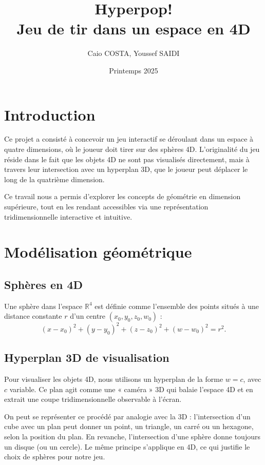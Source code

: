 \documentclass[11pt,a4paper]{article}
\title{Hyperpop! \\ \normalsize{Jeu de tir dans un espace en 4D}}
\author{Caio COSTA, Youssef SAIDI}
\date{Printemps 2025}
\begin{document}
\maketitle

\tableofcontents

\section{Introduction}

Ce projet a consisté à concevoir un jeu interactif se déroulant dans un espace à quatre dimensions, où le joueur doit tirer sur des sphères 4D. L’originalité du jeu réside dans le fait que les objets 4D ne sont pas visualisés directement, mais à travers leur intersection avec un hyperplan 3D, que le joueur peut déplacer le long de la quatrième dimension.

Ce travail nous a permis d'explorer les concepts de géométrie en dimension supérieure, tout en les rendant accessibles via une représentation tridimensionnelle interactive et intuitive.

\section{Modélisation géométrique}

\subsection{Sphères en 4D}

Une sphère dans l’espace $\mathbb{R}^4$ est définie comme l’ensemble des points situés à une distance constante $r$ d’un centre $(x_0, y_0, z_0, w_0)$ :
\[
(x - x_0)^2 + (y - y_0)^2 + (z - z_0)^2 + (w - w_0)^2 = r^2.
\]

\subsection{Hyperplan 3D de visualisation}

Pour visualiser les objets 4D, nous utilisons un hyperplan de la forme $w = c$, avec $c$ variable. Ce plan agit comme une « caméra » 3D qui balaie l’espace 4D et en extrait une coupe tridimensionnelle observable à l’écran.

On peut se représenter ce procédé par analogie avec la 3D : l’intersection d’un cube avec un plan peut donner un point, un triangle, un carré ou un hexagone, selon la position du plan. En revanche, l’intersection d’une sphère donne toujours un disque (ou un cercle). Le même principe s’applique en 4D, ce qui justifie le choix de sphères pour notre jeu.
\end{document}
